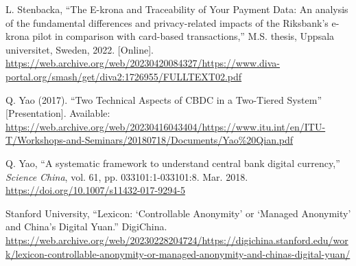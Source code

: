 \begin{enumerate}[leftmargin=0.75cm,label={[\arabic*]}]
  \item L. Stenbacka, ``The E-krona and Traceability of Your Payment Data: An analysis of the fundamental differences and privacy-related impacts of the Riksbank’s e-krona pilot in comparison with card-based transactions,'' M.S. thesis, Uppsala universitet, Sweden, 2022. [Online]. \url{https://web.archive.org/web/20230420084327/https://www.diva-portal.org/smash/get/diva2:1726955/FULLTEXT02.pdf}

  \item Q. Yao (2017). ``Two Technical Aspects of CBDC in a Two-Tiered System'' [Presentation]. Available: \url{https://web.archive.org/web/20230416043404/https://www.itu.int/en/ITU-T/Workshops-and-Seminars/20180718/Documents/Yao\%20Qian.pdf}
  
  \item Q. Yao, ``A systematic framework to understand central bank digital currency,'' \textit{Science China}, vol. 61, pp. 033101:1-033101:8. Mar. 2018. \url{https://doi.org/10.1007/s11432-017-9294-5}
  
  \item Stanford University, ``Lexicon: `Controllable Anonymity' or ‘Managed Anonymity’ and China’s Digital Yuan.'' DigiChina. \url{https://web.archive.org/web/20230228204724/https://digichina.stanford.edu/work/lexicon-controllable-anonymity-or-managed-anonymity-and-chinas-digital-yuan/}
  
\end{enumerate}
